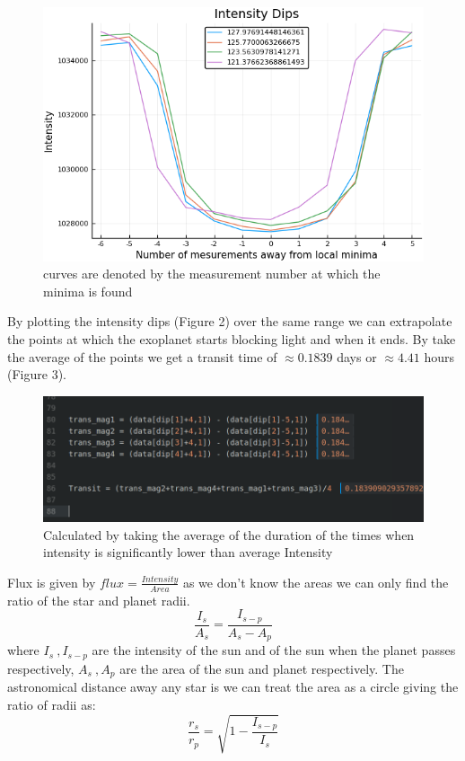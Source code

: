 \documentclass[a4paper,12pt,notitlepage]{article}
\begin{document}
\begin{figure}[h]
    \centering
    \includegraphics[width=\textwidth]{dips.png}
    \caption{curves are denoted by the measurement number at which the minima is found}
\end{figure}

By plotting the intensity dips (Figure 2) over the same range we can extrapolate the points at which the exoplanet starts blocking light and when it ends. By take the average of the points we get a transit time of $\approx 0.1839$ days or $\approx 4.41$ hours (Figure 3).

\begin{figure}[h]
    \centering
    \includegraphics[width=\textwidth]{Transit.png}
    \caption{Calculated by taking the average of the duration of the times when intensity is significantly lower than average Intensity}
\end{figure}

Flux is given by $flux = \frac{Intensity}{Area}$ as we don't know the areas we can only find the ratio of the star and planet radii. 
$$ \frac{I_s}{A_s} = \frac{I_{s-p}}{A_s-A_p} $$
where $I_s\   ,  I_{s-p}$ are the intensity of the sun and of the sun when the planet passes respectively, $A_s\  ,  A_p$ are the area of the sun and planet respectively. The astronomical distance away any star is we can treat the area as a circle giving the ratio of radii as:
$$\frac{r_s}{r_p} = \sqrt{1-\frac{I_{s-p}}{I_s}}$$
\end{document}
